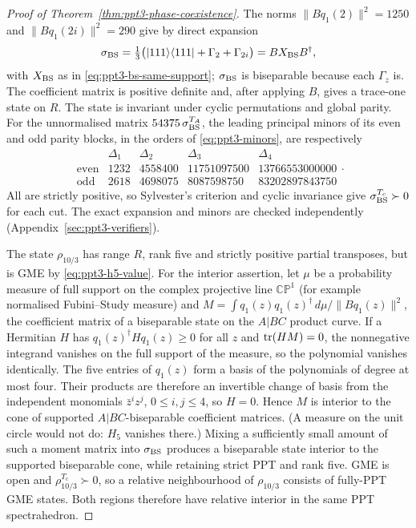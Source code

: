 \begin{proof}[Proof of Theorem~\ref{thm:ppt3-phase-coexistence}]
The norms
$\|Bq_1(2)\|^2=1250$ and
$\|Bq_1(2i)\|^2=290$ give by direct expansion
\[
 \sigma_{\rm BS}
   =\tfrac13\bigl(\lvert111\rangle\langle111\rvert+\Gamma_2+\Gamma_{2i}\bigr)
   =BX_{\rm BS}B^\dagger ,
\]
with $X_{\rm BS}$ as in \eqref{eq:ppt3-bs-same-support}; $\sigma_{\rm BS}$ is biseparable because each
$\Gamma_z$ is. The coefficient matrix
is positive definite and, after applying $B$, gives a trace-one state on $R$.
The state is invariant under cyclic permutations and global parity. For the unnormalised
matrix $54375\,\sigma_{\rm BS}^{T_A}$,
the leading principal minors of its even and odd
parity blocks, in the orders of
\eqref{eq:ppt3-minors}, are respectively
\[
\begin{array}{c|rrrr}
&\Delta_1&\Delta_2&\Delta_3&\Delta_4\\\hline
\mathrm{even}&1232&4558400&11751097500&13766553000000\\
\mathrm{odd}&2618&4698075&8087598750&83202897843750
\end{array}.
\]
All are strictly positive, so Sylvester's criterion
and cyclic invariance give
$\sigma_{\rm BS}^{T_c}\succ0$ for each cut.
The exact expansion and minors are checked
independently (Appendix~\ref{sec:ppt3-verifiers}).

The state $\rho_{10/3}$ has range $R$,
rank five and strictly positive partial transposes,
but is GME by \eqref{eq:ppt3-h5-value}.
For the interior assertion, let $\mu$ be a probability
measure of full support on the complex projective line $\mathbb{CP}^1$ (for example
normalised Fubini--Study measure) and
$M=\int q_1(z)q_1(z)^\dagger\,d\mu/\|Bq_1(z)\|^2$, the
coefficient matrix of a biseparable state on the
$A|BC$ product curve. If a Hermitian $H$ has
$q_1(z)^\dagger Hq_1(z)\ge0$ for all $z$ and
$\operatorname{tr}(HM)=0$, the nonnegative integrand vanishes on the full support of the measure, so the polynomial vanishes identically. The
five entries of $q_1(z)$ form a basis of the polynomials of degree at most four. Their products are therefore an
invertible change of basis from the independent monomials $\bar z^i z^j$, $0\le i,j\le4$, so $H=0$. Hence $M$ is
interior to the cone of supported $A|BC$-biseparable
coefficient matrices. (A measure on the unit circle
would not do: $H_5$ vanishes there.)
Mixing a sufficiently small amount
of such a moment matrix into $\sigma_{\rm BS}$
produces a biseparable state interior to the
supported biseparable cone, while retaining
strict PPT and rank five. GME is open and $\rho_{10/3}^{T_c}\succ0$,
so a relative neighbourhood of $\rho_{10/3}$
consists of fully-PPT GME states. Both regions therefore have relative interior in the same PPT spectrahedron.
\end{proof}

